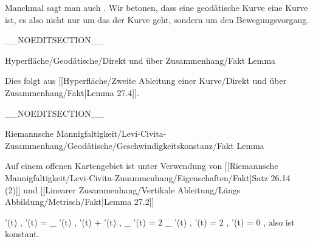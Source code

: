 Manchmal sagt man auch  {.} Wir betonen, dass eine geodätische Kurve eine Kurve ist, es also nicht nur um das
der Kurve geht, sondern um den Bewegungsvorgang.

__NOEDITSECTION__

{Hyperfläche/Geodätische/Direkt und über Zusammenhang/Fakt}
{Lemma}
{}
{

\faktzusatz {}
\faktzusatz {}

}
{

Dies folgt aus
[[Hyperfläche/Zweite Ableitung einer Kurve/Direkt und über Zusammenhang/Fakt|Lemma 27.4]].

}

__NOEDITSECTION__

{Riemannsche Mannigfaltigkeit/Levi-Civita-Zusammenhang/Geodätische/Geschwindigkeitskonstanz/Fakt}
{Lemma}
{}
{

\faktzusatz {}
\faktzusatz {}

}
{

Auf einem offenen Kartengebiet ist unter Verwendung von
[[Riemannsche Mannigfaltigkeit/Levi-Civita-Zusammenhang/Eigenschaften/Fakt|Satz 26.14  (2)]]
und
[[Linearer Zusammenhang/Vertikale Ableitung/Längs Abbildung/Metrisch/Fakt|Lemma 27.2]]

\mavergleichskettealign
{\vergleichskettealign
{ {  }  \left\langle  \gamma'(t) ,  \gamma'(t)  \right\rangle
}
{ =} { \left\langle \nabla_{ {  }  }\gamma'(t) ,  \gamma'(t)  \right\rangle + \left\langle  \gamma'(t) , \nabla_{  {  }  }\gamma'(t)  \right\rangle
}
{ =} { 2 \left\langle \nabla_{ {  }  }\gamma'(t) ,  \gamma'(t)  \right\rangle
}
{ =} { 2 \left{}  ,  \gamma'(t)  \right\rangle
}
{ =} { 0
}
}
{}
{}{,}
also ist
 konstant.

}

